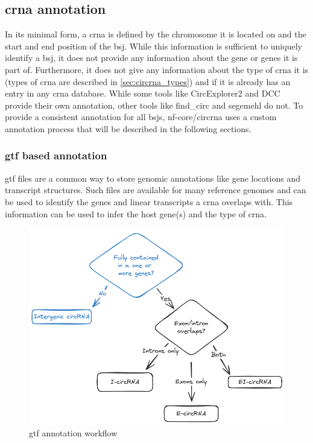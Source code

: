 \subsection{\gls{crna} annotation}
In its minimal form, a \gls{crna} is defined by the chromosome it is located on
and the start and end position of the \gls{bsj}.
While this information is sufficient to uniquely identify a \gls{bsj}, it does
not provide any information about the gene or genes it is part of.
Furthermore, it does not give any information about the type of \gls{crna} it
is (types of \gls{crna} are described in \cref{sec:circrna_types}) and if it is
already has an entry in any \gls{crna} database.
While some tools like CircExplorer2 and DCC provide their own annotation, other
tools like find\_circ and segemehl do not.
To provide a consistent annotation for all \glspl{bsj}, nf-core/circrna uses a
custom annotation process that will be described in the following sections.

\subsubsection{\gls{gtf} based annotation}
\gls{gtf} files are a common way to store genomic annotations like gene
locations and
transcript structures.
Such files are available for many reference genomes and can be used to identify
the genes and linear transcripts a \gls{crna} overlaps with.
This information can be used to infer the host gene(s) and the type of
\gls{crna}.

\begin{figure}[ht]
    \centering

    \includegraphics[width=\textwidth]{chapters/3_materials_and_methods/figures/annotation.png}
    \caption{\gls{gtf} annotation workflow} %
    \label{fig:gtf_annotation}
\end{figure}

